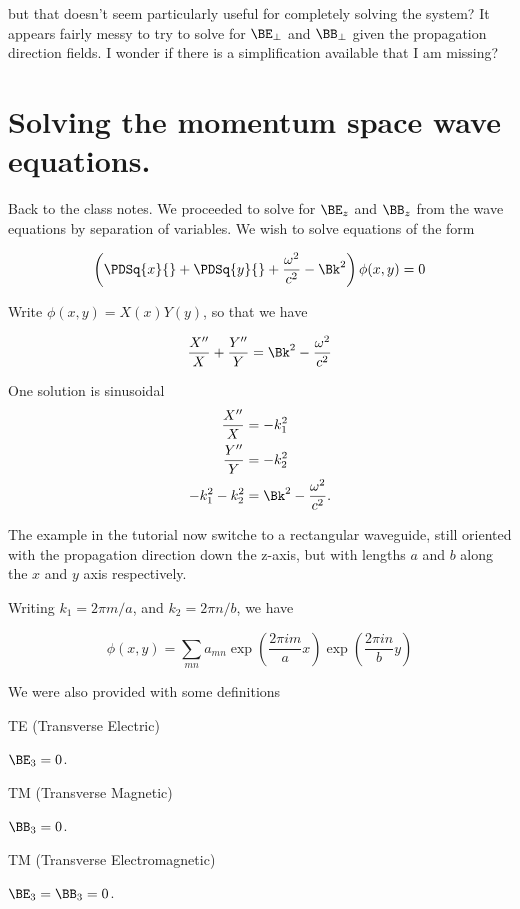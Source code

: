 but that doesn't seem particularly useful for completely solving the system?  It appears fairly messy to try to solve for $\BE_\perp$ and $\BB_\perp$ given the propagation direction fields.  I wonder if there is a simplification available that I am missing?

\section{Solving the momentum space wave equations.}

Back to the class notes.  We proceeded to solve for $\BE_z$ and $\BB_z$ from the wave equations by separation of variables.  We wish to solve equations of the form

\begin{equation}\label{eqn:relativisticElectrodynamicsT4:360}
\left( \PDSq{x}{} + \PDSq{y}{} + \frac{\omega^2}{c^2} - \Bk^2 \right) \phi(x,y) = 0
\end{equation}

Write $\phi(x,y) = X(x) Y(y)$, so that we have

\begin{equation}\label{eqn:relativisticElectrodynamicsT4:380}
\frac{X''}{X} + \frac{Y''}{Y} = \Bk^2 - \frac{\omega^2}{c^2}
\end{equation}

One solution is sinusoidal
\begin{align}\label{eqn:relativisticElectrodynamicsT4:400}
\frac{X''}{X} &= -k_1^2 \\
\frac{Y''}{Y} &= -k_2^2 \\
-k_1^2 - k_2^2
&= \Bk^2 - \frac{\omega^2}{c^2}.
\end{align}

The example in the tutorial now switche to a rectangular waveguide, still oriented with the propagation direction down the z-axis, but with lengths $a$ and $b$ along the $x$ and $y$ axis respectively.

Writing $k_1 = 2\pi m/a$, and $k_2 = 2 \pi n/ b$, we have

\begin{equation}\label{eqn:relativisticElectrodynamicsT4:420}
\phi(x, y) = \sum_{mn} a_{mn} 
\exp\left( \frac{2 \pi i m}{a} x \right)
\exp\left( \frac{2 \pi i n}{b} y \right)
\end{equation}

We were also provided with some definitions

\begin{definition}TE (Transverse Electric)

$\BE_3 = 0$.
\end{definition}
\begin{definition}
TM (Transverse Magnetic)

$\BB_3 = 0$.
\end{definition}
\begin{definition}
TM (Transverse Electromagnetic)

$\BE_3 = \BB_3 = 0$.
\end{definition}

